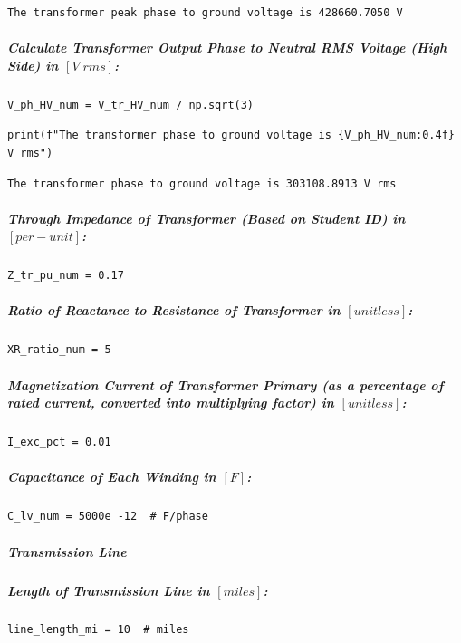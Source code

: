\begin{verbatim}
The transformer peak phase to ground voltage is 428660.7050 V
\end{verbatim}

\subparagraph{Calculate Transformer Output Phase to Neutral RMS Voltage (High Side) in $\left[V\;rms\right]$:}

\begin{verbatim}
V_ph_HV_num = V_tr_HV_num / np.sqrt(3)
\end{verbatim}

\begin{verbatim}
print(f"The transformer phase to ground voltage is {V_ph_HV_num:0.4f} V rms")
\end{verbatim}

\begin{verbatim}
The transformer phase to ground voltage is 303108.8913 V rms
\end{verbatim}

\subparagraph{Through Impedance of Transformer (Based on Student ID) in $\left[per -unit \right]$:}

\begin{verbatim}
Z_tr_pu_num = 0.17
\end{verbatim}

\subparagraph{Ratio of Reactance to Resistance of Transformer in $\left[unitless \right]$:}

\begin{verbatim}
XR_ratio_num = 5
\end{verbatim}

\subparagraph{Magnetization Current of Transformer Primary (as a percentage of rated current, converted into multiplying factor) in $\left[unitless\right]$:}

\begin{verbatim}
I_exc_pct = 0.01
\end{verbatim}

\subparagraph{Capacitance of Each Winding in $\left[F\right]$:}

\begin{verbatim}
C_lv_num = 5000e -12  # F/phase
\end{verbatim}

\subparagraph{Transmission Line}

\subparagraph{Length of Transmission Line in $\left[miles\right]$:}

\begin{verbatim}
line_length_mi = 10  # miles
\end{verbatim}

